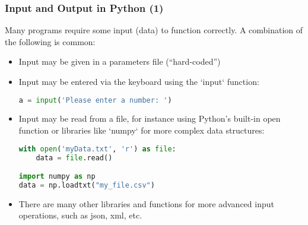 
\begin{frame}[fragile]
  \frametitle{Input and Output in Python (1)}
  Many programs require some input (data) to function correctly. A combination of the following is common:
  \begin{itemize}[<+->]
    \item Input may be given in a parameters file (``hard-coded'')
    \item Input may be entered via the keyboard using the `input` function:
    \begin{lstlisting}[language=Python]
a = input('Please enter a number: ')
    \end{lstlisting}
    \item Input may be read from a file, for instance using Python's built-in open function or libraries like `numpy` for more complex data structures:
    \begin{lstlisting}[language=Python]
with open('myData.txt', 'r') as file:
    data = file.read()

import numpy as np
data = np.loadtxt("my_file.csv")
    \end{lstlisting}
    \item There are many other libraries and functions for more advanced input operations, such as json, xml, etc.
  \end{itemize}
 \end{frame}

